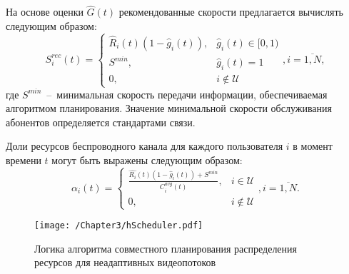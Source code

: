 На основе оценки $\hat{G}(t)$ рекомендованные скорости предлагается вычислять следующим образом:
\begin{equation}
\label{eq:SReqCalc}
S^{rec}_i(t) =
\begin{cases}
\hat{R}_i(t) (1 - \hat{g}_i(t)), & \hat{g}_i(t) \in [0,1) \\
S^{min}, &  \hat{g}_i(t) = 1 \\
0,& i \notin \mathcal{U}
\end{cases}, i = \overline{1,N},
\end{equation}
где $S^{min}$~--~минимальная скорость передачи информации, обеспечиваемая алгоритмом планирования. Значение минимальной скорости обслуживания абонентов определяется стандартами связи.

Доли ресурсов беспроводного канала для каждого пользователя $i$ в момент времени $t$ могут быть выражены следующим образом:
$$\alpha_i(t) = \begin{cases}
\frac{\hat{R_i}(t) (1 - \hat{g}_i(t)) + S^{min}}{C^{avg}_i(t)}, & i \in \mathcal{U}  \\
0, & i \notin \mathcal{U}
\end{cases}, i = \overline{1,N}.$$

\begin{figure}[htbp]
\begin{center}
\texttt{[image: /Chapter3/hScheduler.pdf]}
\caption{Логика алгоритма совместного планирования распределения ресурсов для неадаптивных видеопотоков}
\label{fig:HScheduler}
\end{center}
\end{figure}


